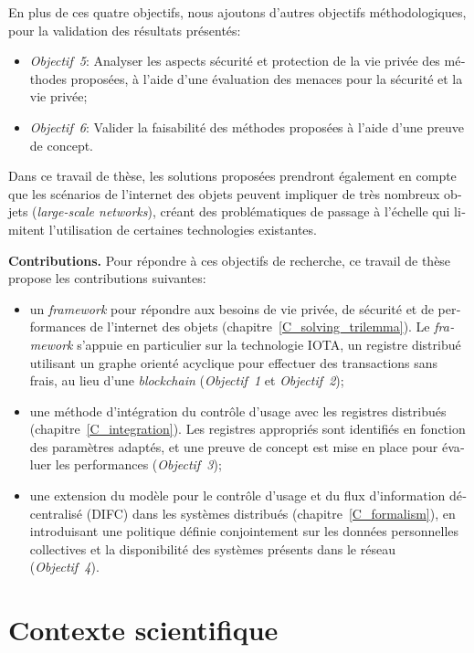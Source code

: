 \begin{otherlanguage}{french}
En plus de ces quatre objectifs, nous ajoutons d'autres objectifs méthodologiques, pour la validation des résultats présentés:

\begin{itemize}
    \item \emph{Objectif~5}: Analyser les aspects sécurité et protection de la vie privée des méthodes proposées, à l'aide d'une évaluation des menaces pour la sécurité et la vie privée;
    \item \emph{Objectif~6}: Valider la faisabilité des méthodes proposées à l'aide d'une preuve de concept.
\end{itemize}

Dans ce travail de thèse, les solutions proposées prendront également en compte que les scénarios de l'internet des objets peuvent impliquer de très nombreux objets (\emph{large-scale networks}), créant des problématiques de passage à l'échelle qui limitent l'utilisation de certaines technologies existantes.
 
\textbf{Contributions.} Pour répondre à ces objectifs de recherche, ce travail de thèse propose les contributions suivantes:

\begin{itemize}
    \item un \emph{framework} pour répondre aux besoins
    de vie privée, de sécurité et de performances de l'internet des objets
    (chapitre~\ref{C_solving_trilemma}). Le \emph{framework} s'appuie en particulier sur la technologie IOTA, un registre distribué utilisant un graphe orienté acyclique pour effectuer des transactions sans frais, au lieu d'une \emph{blockchain} (\emph{Objectif~1} et \emph{Objectif~2});
    \item une méthode d'intégration du contrôle d'usage avec les registres distribués (chapitre~\ref{C_integration}). Les registres appropriés sont identifiés en fonction des paramètres adaptés, et une preuve de concept est mise en place pour évaluer les performances (\emph{Objectif~3});
    \item une extension du modèle pour le contrôle d'usage et du flux d'information décentralisé (DIFC) dans les systèmes distribués (chapitre~\ref{C_formalism}), en introduisant une politique définie conjointement sur les données personnelles collectives et la disponibilité des systèmes présents dans le réseau (\emph{Objectif~4}).
\end{itemize}

\section*{Contexte scientifique} 


\end{otherlanguage}
